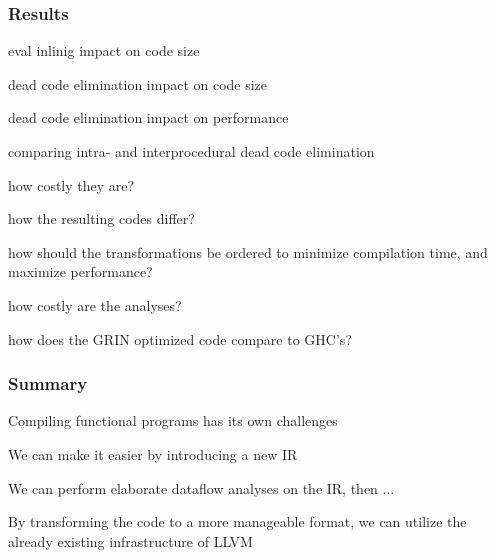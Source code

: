 \documentclass[bigger]{beamer}
\begin{document}
\begin{frame}
\frametitle{Results}
\begin{vfitemize}
	\item eval inlinig impact on code size
	\item dead code elimination impact on code size
	\item dead code elimination impact on performance
	\item comparing intra- and interprocedural dead code elimination
		\item how costly they are?
		\item how the resulting codes differ?
	\item how should the transformations be ordered to minimize compilation time, and maximize performance?
	\item how costly are the analyses?
	\item how does the GRIN optimized code compare to GHC's?
\end{vfitemize}
\end{frame}

\begin{frame}
	\frametitle{Summary}
	\begin{vfitemize}
		\item Compiling functional programs has its own challenges
		\item We can make it easier by introducing a new IR
		\item We can perform elaborate dataflow analyses on the IR, then ...
		\item By transforming the code to a more manageable format, we can utilize the already existing infrastructure of LLVM
	\end{vfitemize}
\end{frame}
\end{document}
